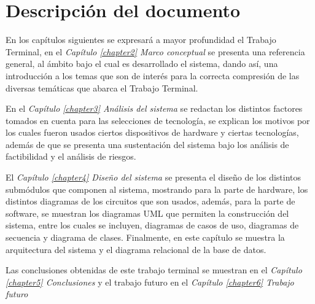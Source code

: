 \section{Descripción del documento}
En los capítulos siguientes se expresará a mayor profundidad el Trabajo Terminal, en el \textit{Capítulo \ref{chapter2} Marco conceptual} se presenta una referencia general, al ámbito bajo el cual es desarrollado el sistema, dando así, una introducción a los temas que son de interés para la correcta compresión de las diversas temáticas que abarca el Trabajo Terminal.

En el \textit{Capítulo \ref{chapter3} Análisis del sistema} se redactan los distintos factores tomados en cuenta para las selecciones de tecnología, se explican los motivos por los cuales fueron usados ciertos dispositivos de hardware y ciertas tecnologías, además de que se presenta una sustentación del sistema bajo los análisis de factibilidad y el análisis de riesgos.

El \textit{Capítulo \ref{chapter4} Diseño del sistema} se presenta el diseño de los distintos submódulos que componen al sistema, mostrando para la parte de hardware, los distintos diagramas de los circuitos que son usados, además, para la parte de software, se muestran los diagramas UML que permiten la construcción del sistema, entre los cuales se incluyen, diagramas de casos de uso, diagramas de secuencia y diagrama de clases. Finalmente, en este capítulo se muestra la arquitectura del sistema y el diagrama relacional de la base de datos.

Las conclusiones obtenidas de este trabajo terminal se muestran en el \textit{Capítulo \ref{chapter5} Conclusiones} y el trabajo futuro en el \textit{Capítulo \ref{chapter6} Trabajo futuro}